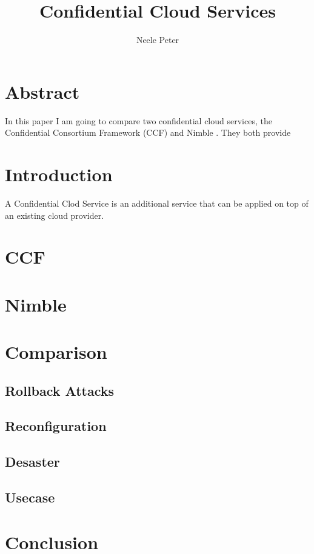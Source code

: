 \documentclass[sigconf]{acmart}
\title{Confidential Cloud Services}
\author{Neele Peter}
\affiliation{%
  \institution{Friedrich-Alexander-Universit\"at Erlangen-N\"urnberg}}
\begin{document}
	
	
\maketitle

\section{Abstract}	
	In this paper I am going to compare two confidential cloud services, the Confidential Consortium Framework (CCF) \cite{Howard} and Nimble \cite{Nimble}. They both provide \\


\section{Introduction}
	A Confidential Clod Service is an additional service that can be applied on top of an existing cloud provider. 
	
\newpage

\section{CCF}	
\newpage

\section{Nimble}
\newpage

\section{Comparison}
\subsection{Rollback Attacks}
\subsection{Reconfiguration}
\subsection{Desaster}
\subsection{Usecase}
\newpage

\section{Conclusion}

\newpage


	
\end{document}
